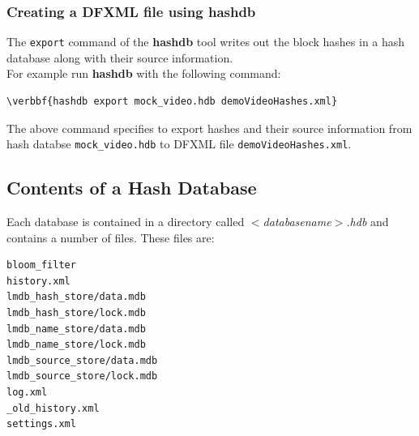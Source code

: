 \documentclass[11pt,fleqn]{article} %
\begin{document}
\subsubsection{Creating a DFXML file using \textbf{hashdb}}
The \texttt{export} command of the \textbf{hashdb} tool writes out the block hashes in a hash database along with their source information. \\

For example run \textbf{hashdb} with the following command:\\
\begin{Verbatim}[commandchars=\\\{\}]
\verbbf{hashdb export mock_video.hdb demoVideoHashes.xml}
\end{Verbatim}
The above command specifies to export hashes and their source information from hash databse \texttt{mock\_video.hdb} to DFXML file \texttt{demoVideoHashes.xml}.

\subsection{Contents of a Hash Database}
Each \hash database is contained in a directory called \textit{$<$databasename$>$.hdb} and contains a number of files. These files are:
\begin{verbatim}
bloom_filter
history.xml
lmdb_hash_store/data.mdb
lmdb_hash_store/lock.mdb
lmdb_name_store/data.mdb
lmdb_name_store/lock.mdb
lmdb_source_store/data.mdb
lmdb_source_store/lock.mdb
log.xml
_old_history.xml
settings.xml
\end{verbatim}
\end{document}
